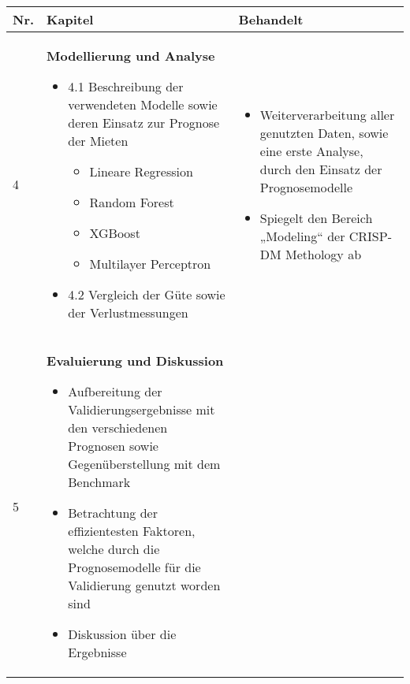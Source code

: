 \newpage
\begin{table}[H]
    \begin{tabularx}{\textwidth}[ht]{|l|X|X|}
      \hline
      \textbf{Nr.} & \textbf{Kapitel} & \textbf{Behandelt}\\
      \hline
      \hline
        4 & \textbf{Modellierung und Analyse} 
        
        \begin{itemize}
            \item 4.1 Beschreibung der verwendeten Modelle sowie deren Einsatz zur 
            Prognose der Mieten 
            \begin{itemize}
                \item Lineare Regression
                \item Random Forest
                \item XGBoost
                \item Multilayer Perceptron
            \end{itemize}
            \item 4.2 Vergleich der Güte sowie der Verlustmessungen
        \end{itemize}
        
        & \begin{itemize}
            \item Weiterverarbeitung aller genutzten Daten, sowie eine erste 
            Analyse, durch den Einsatz der Prognosemodelle
            \item Spiegelt den Bereich „Modeling“ der CRISP-DM Methology ab
        \end{itemize}\\
        \hline\hline
        5 & \textbf{Evaluierung und Diskussion} 
        
        \begin{itemize}
            \item Aufbereitung der Validierungsergebnisse mit den verschiedenen 
            Prognosen sowie Gegenüberstellung mit dem Benchmark
            \item Betrachtung der effizientesten Faktoren, welche durch die 
            Prognosemodelle für die Validierung genutzt worden sind
            \item Diskussion über die Ergebnisse
        \end{itemize}


\end{tabularx}
\end{table}
